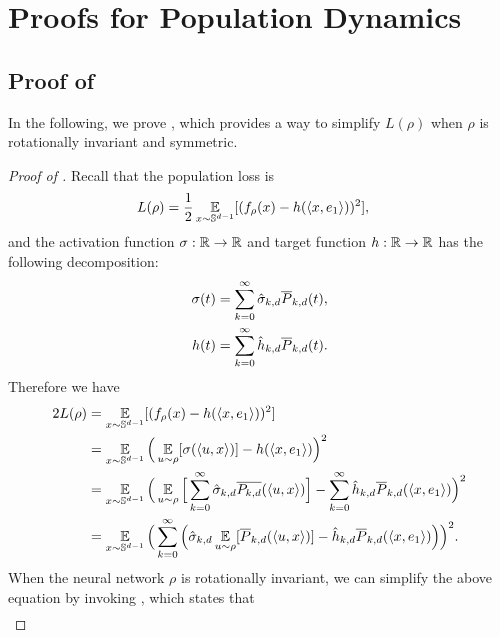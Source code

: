 
\section{Proofs for Population Dynamics} \label{appendix:population_case}

\subsection{Proof of }\label{app:pf-lem-plf}

In the following, we prove , which provides a way to simplify $L(\rho)$ when $\rho$ is rotationally invariant and symmetric.

\begin{proof}[Proof of ]
Recall that the population loss is
\begin{align}   
L(\rho)
& = \frac{1}{2}\operatorname*{\mathbb{E}}_{x \sim \mathbb{S}^{d - 1}} [(f_\rho(x) - h(\left<x, e_1\right>))^2],
\end{align}
and the activation function $\sigma:\mathbb{R}\to\mathbb{R}$ and target function $h:\mathbb{R}\to\mathbb{R}$ has the following decomposition:
\begin{align}
    \sigma(t)&=\sum_{k=0}^{\infty}\hat{\sigma}_{k, d}\overline{P}_{k,d}(t),\\
    h(t)&=\sum_{k=0}^{\infty}\hat{h}_{k, d}\overline{P}_{k,d}(t).
\end{align}
Therefore we have
\begin{align} \label{eq:pop_loss_first_step}
2L(\rho)
& = \operatorname*{\mathbb{E}}_{x \sim \mathbb{S}^{d - 1}} [(f_\rho(x) - h(\left<x, e_1\right>))^2] \\
& = \operatorname*{\mathbb{E}}_{x \sim \mathbb{S}^{d - 1}} \Big( \operatorname*{\mathbb{E}}_{u \sim \rho}[\sigma(\left<u, x\right>)] - h(\left<x, e_1\right>) \Big)^2 \\
& = \operatorname*{\mathbb{E}}_{x \sim \mathbb{S}^{d - 1}} \Big(\operatorname*{\mathbb{E}}_{u \sim \rho}\Big[ \sum_{k = 0}^\infty \hat{\sigma}_{k, d} \overline{P_{k, d}} (\left<u, x\right>) \Big] - \sum_{k = 0}^\infty \hat{h}_{k, d} \overline{P}_{k, d}(\left<x, e_1\right>) \Big)^2 \\
& = \operatorname*{\mathbb{E}}_{x \sim \mathbb{S}^{d - 1}} \Big(\sum_{k=0}^\infty \Big(\hat{\sigma}_{k, d} \operatorname*{\mathbb{E}}_{u \sim \rho} [\overline{P}_{k,d}(\left<u, x\right>)] - \hat{h}_{k, d} \overline{P}_{k,d}(\left<x, e_1\right>) \Big) \Big)^2.
\end{align}
When the neural network $\rho$ is rotationally invariant, we can simplify the above equation by invoking , which states that 
\begin{align}

\end{align}
\end{proof}
